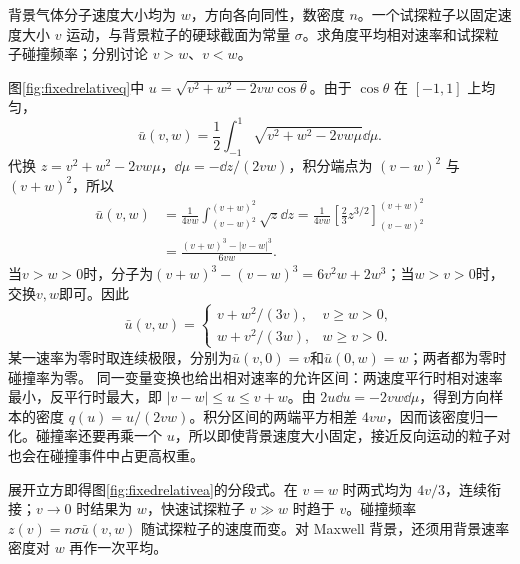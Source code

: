 \begin{example}[固定速度粒子的相对碰撞频率]
背景气体分子速度大小均为 $w$，方向各向同性，数密度 $n$。一个试探粒子以固定速度大小 $v$ 运动，与背景粒子的硬球截面为常量 $\sigma$。求角度平均相对速率和试探粒子碰撞频率；分别讨论 $v>w$、$v<w$。
\end{example}
\begin{solution}
图\ref{fig:fixedrelativeq}中 $u=\sqrt{v^2+w^2-2vw\cos\theta}$。由于 $\cos\theta$ 在 $[-1,1]$ 上均匀，
\[
 \bar u(v,w)=\frac12\int_{-1}^1\sqrt{v^2+w^2-2vw\mu}\dd\mu.
\]
代换 $z=v^2+w^2-2vw\mu$，$\dd\mu=-\dd z/(2vw)$，积分端点为 $(v-w)^2$ 与 $(v+w)^2$，所以
\[
\begin{aligned}
\bar u(v,w)&=\frac1{4vw}\int_{(v-w)^2}^{(v+w)^2}\sqrt z\dd z
=\frac1{4vw}\left[\frac23z^{3/2}\right]_{(v-w)^2}^{(v+w)^2}\\
&=\frac{(v+w)^3-|v-w|^3}{6vw}.
\end{aligned}
\]
当$v>w>0$时，分子为$(v+w)^3-(v-w)^3=6v^2w+2w^3$；当$w>v>0$时，交换$v,w$即可。因此
\[\bar u(v,w)=\begin{cases}
v+w^2/(3v),&v\ge w>0,\\
w+v^2/(3w),&w\ge v>0.
\end{cases}\]
某一速率为零时取连续极限，分别为$\bar u(v,0)=v$和$\bar u(0,w)=w$；两者都为零时碰撞率为零。
同一变量变换也给出相对速率的允许区间：两速度平行时相对速率最小，反平行时最大，即 $|v-w|\le u\le v+w$。由 $2u\dd u=-2vw\dd\mu$，得到方向样本的密度 $q(u)=u/(2vw)$。积分区间的两端平方相差 $4vw$，因而该密度归一化。碰撞率还要再乘一个 $u$，所以即使背景速度大小固定，接近反向运动的粒子对也会在碰撞事件中占更高权重。

展开立方即得图\ref{fig:fixedrelativea}的分段式。在 $v=w$ 时两式均为 $4v/3$，连续衔接；$v\to0$ 时结果为 $w$，快速试探粒子 $v\gg w$ 时趋于 $v$。碰撞频率 $z(v)=n\sigma\bar u(v,w)$ 随试探粒子的速度而变。对 Maxwell 背景，还须用背景速率密度对 $w$ 再作一次平均。
\end{solution}

